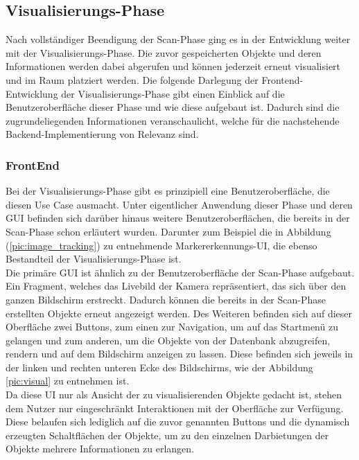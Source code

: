 \subsection{Visualisierungs-Phase} 
Nach vollständiger Beendigung der Scan-Phase ging es in der Entwicklung weiter mit der Visualisierungs-Phase. Die zuvor gespeicherten Objekte und 
deren Informationen werden dabei abgerufen und können jederzeit erneut visualisiert und im Raum platziert werden. Die folgende Darlegung der 
Frontend-Entwicklung der Visualisierungs-Phase gibt einen Einblick auf die Benutzeroberfläche dieser Phase und wie diese aufgebaut ist. Dadurch sind die 
zugrundeliegenden Informationen veranschaulicht, welche für die nachstehende Backend-Implementierung von Relevanz sind.   
\subsubsection{FrontEnd}
Bei der Visualisierungs-Phase gibt es prinzipiell eine Benutzeroberfläche, die diesen Use Case ausmacht. Unter eigentlicher Anwendung dieser Phase und 
deren \acs{GUI} befinden sich darüber hinaus weitere Benutzeroberflächen, die bereits in der Scan-Phase schon erläutert wurden. Darunter zum Beispiel 
die in Abbildung (\ref{pic:image_tracking}) zu entnehmende Markererkennungs-\acs{UI}, die ebenso Bestandteil der Visualisierungs-Phase ist. 
\\ 
Die primäre \acs{GUI} ist ähnlich zu der Benutzeroberfläche der Scan-Phase aufgebaut. Ein Fragment, welches das Livebild der Kamera repräsentiert, das 
sich über den ganzen Bildschirm erstreckt. Dadurch können die bereits in der Scan-Phase erstellten Objekte erneut angezeigt werden. Des Weiteren befinden 
sich auf dieser Oberfläche zwei Buttons, zum einen zur Navigation, um auf das Startmenü zu gelangen und zum anderen, um die Objekte von der Datenbank 
abzugreifen, rendern und auf dem Bildschirm anzeigen zu lassen. Diese befinden sich jeweils in der linken und rechten unteren Ecke des Bildschirms, wie 
der Abbildung \ref{pic:visual} zu entnehmen ist. 
\\ 
Da diese \acs{UI} nur als Ansicht der zu visualisierenden Objekte gedacht ist, stehen dem Nutzer nur eingeschränkt Interaktionen mit der Oberfläche zur 
Verfügung. Diese belaufen sich lediglich auf die zuvor genannten Buttons und die dynamisch erzeugten Schaltflächen der Objekte, um zu den einzelnen 
Darbietungen der Objekte mehrere Informationen zu erlangen. 
